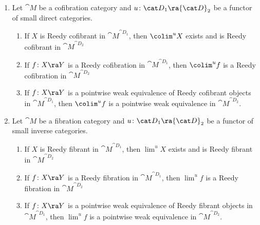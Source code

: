 \begin{thm}
\label{thm::colimpairdirectcat}
\mbox{}
\begin{enumerate}
\item
Let ${\cat M}$ be a cofibration category and $u \colon {\cat D}_1 \ra {\cat D}_2$ be a functor of small direct categories.
\begin{enumerate}
\item
If $X$ is Reedy cofibrant in ${\cat M}^{{\cat D}_1}$, then $\colim^u X$ exists and is Reedy cofibrant in ${\cat M}^{{\cat D}_2}$
\item
If $f \colon X \ra Y$ is a Reedy cofibration in ${\cat M}^{{\cat D}_1}$, then $\colim^u f$ is a Reedy cofibration in ${\cat M}^{{\cat D}_2}$
\item
If $f \colon X \ra Y$ is a pointwise weak equivalence of Reedy cofibrant objects in ${\cat M}^{{\cat D}_1}$, then $\colim^u f$ is a pointwise weak equivalence in ${\cat M}^{{\cat D}_2}$.
\end{enumerate}
\item
Let ${\cat M}$ be a fibration category and $u \colon {\cat D}_1 \ra {\cat D}_2$ be a functor of small inverse categories.
\begin{enumerate}
\item
If $X$ is Reedy fibrant in ${\cat M}^{{\cat D}_1}$, then $\lim^u X$ exists and is Reedy fibrant in ${\cat M}^{{\cat D}_2}$
\item
If $f \colon X \ra Y$ is a Reedy fibration in ${\cat M}^{{\cat D}_1}$, then $\lim^u f$ is a Reedy fibration in ${\cat M}^{{\cat D}_2}$
\item
If $f \colon X \ra Y$ is a pointwise weak equivalence of Reedy fibrant objects in ${\cat M}^{{\cat D}_1}$, then $\lim^u f$ is a pointwise weak equivalence in ${\cat M}^{{\cat D}_2}$.
\end{enumerate}
\end{enumerate}
\end{thm}

